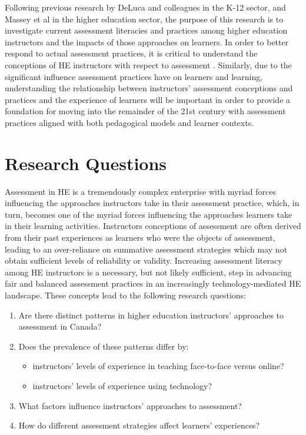 \documentclass[
]{book}
\providecommand{\tightlist}{%
  \setlength{\itemsep}{0pt}\setlength{\parskip}{0pt}}
\begin{document}
Following previous research by DeLuca and colleagues \citep{delucaTeachersApproachesClassroom2016, delucaExploringAssessmentCultures2021, delucaApproachesClassroomAssessment2016} in the K-12 sector, and Massey et al \citeyearpar{masseyAssessmentLiteracyCollege2020} in the higher education sector, the purpose of this research is to investigate current assessment literacies and practices among higher education instructors and the impacts of those approaches on learners. In order to better respond to actual assessment practices, it is critical to understand the conceptions of HE instructors with respect to assessment \citep{delucaExploringAssessmentCultures2021, offerdahlChangesInstructorsAssessment2011}. Similarly, due to the significant influence assessment practices have on learners and learning, understanding the relationship between instructors' assessment conceptions and practices and the experience of learners will be important in order to provide a foundation for moving into the remainder of the 21st century with assessment practices aligned with both pedagogical models and learner contexts.

\hypertarget{research-questions}{%
\section*{Research Questions}\label{research-questions}}

Assessment in HE is a tremendously complex enterprise with myriad forces influencing the approaches instructors take in their assessment practice, which, in turn, becomes one of the myriad forces influencing the approaches learners take in their learning activities. Instructors conceptions of assessment are often derived from their past experiences as learners who were the objects of assessment, leading to an over-reliance on summative assessment strategies which may not obtain sufficient levels of reliability or validity. Increasing assessment literacy among HE instructors is a necessary, but not likely sufficient, step in advancing fair and balanced assessment practices in an increasingly technology-mediated HE landscape. These concepts lead to the following research questions:

\begin{enumerate}
\def\labelenumi{\arabic{enumi}.}
\tightlist
\item
  Are there distinct patterns in higher education instructors' approaches to assessment in Canada?
\item
  Does the prevalence of these patterns differ by:

  \begin{itemize}
  \tightlist
  \item
    instructors' levels of experience in teaching face-to-face versus online?
  \item
    instructors' levels of experience using technology?
  \end{itemize}
\item
  What factors influence instructors' approaches to assessment?
\item
  How do different assessment strategies affect learners' experiences?
\end{enumerate}
\end{document}
